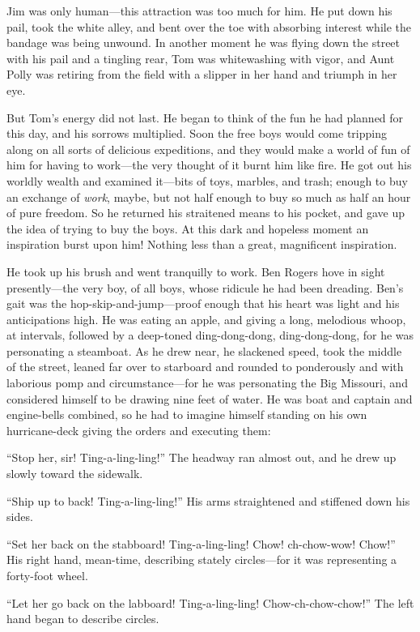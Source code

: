 \documentclass{book}
\begin{document}
Jim was only human—this attraction was too much for him. He put down his pail, took the white alley, and bent over the toe with absorbing interest while the bandage was being unwound. In another moment he was flying down the street with his pail and a tingling rear, Tom was whitewashing with vigor, and Aunt Polly was retiring from the field with a slipper in her hand and triumph in her eye.

But Tom’s energy did not last. He began to think of the fun he had planned for this day, and his sorrows multiplied. Soon the free boys would come tripping along on all sorts of delicious expeditions, and they would make a world of fun of him for having to work—the very thought of it burnt him like fire. He got out his worldly wealth and examined it—bits of toys, marbles, and trash; enough to buy an exchange of \emph{work}, maybe, but not half enough to buy so much as half an hour of pure freedom. So he returned his straitened means to his pocket, and gave up the idea of trying to buy the boys. At this dark and hopeless moment an inspiration burst upon him! Nothing less than a great, magnificent inspiration.

He took up his brush and went tranquilly to work. Ben Rogers hove in sight presently—the very boy, of all boys, whose ridicule he had been dreading. Ben’s gait was the hop-skip-and-jump—proof enough that his heart was light and his anticipations high. He was eating an apple, and giving a long, melodious whoop, at intervals, followed by a deep-toned ding-dong-dong, ding-dong-dong, for he was personating a steamboat. As he drew near, he slackened speed, took the middle of the street, leaned far over to starboard and rounded to ponderously and with laborious pomp and circumstance—for he was personating the Big Missouri, and considered himself to be drawing nine feet of water. He was boat and captain and engine-bells combined, so he had to imagine himself standing on his own hurricane-deck giving the orders and executing them:

“Stop her, sir! Ting-a-ling-ling!” The headway ran almost out, and he drew up slowly toward the sidewalk.

“Ship up to back! Ting-a-ling-ling!” His arms straightened and stiffened down his sides.

“Set her back on the stabboard! Ting-a-ling-ling! Chow! ch-chow-wow! Chow!” His right hand, mean-time, describing stately circles—for it was representing a forty-foot wheel.

“Let her go back on the labboard! Ting-a-ling-ling! Chow-ch-chow-chow!” The left hand began to describe circles.
\end{document}

